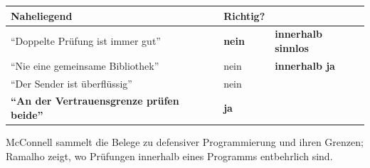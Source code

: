 \begin{warnung}
\begin{center}
\renewcommand{\arraystretch}{1.5}
\begin{tabular}{@{}P{3.2cm}P{2.2cm}P{2.4cm}@{}}
\toprule
\textbf{Naheliegend} & \textbf{Richtig?} & \\
\midrule
\enquote{Doppelte Prüfung ist immer gut} & \textcolor{akzent}{\textbf{nein}} & \textcolor{akzent}{\textbf{innerhalb sinnlos}}\\
\enquote{Nie eine gemeinsame Bibliothek} & \textcolor{akzent}{nein} & \textbf{innerhalb ja}\\
\enquote{Der Sender ist überflüssig} & \textcolor{akzent}{nein} & \\
\textbf{\enquote{An der Vertrauensgrenze prüfen beide}} & \textcolor{gruen}{\textbf{ja}} & \\
\bottomrule
\end{tabular}
\end{center}

\begin{center}
\begin{minipage}{0.88\textwidth}
\end{minipage}
\end{center}

\begin{center}
\end{center}
\end{warnung}
\vspace{-4pt}
\noindent McConnell sammelt die Be\-le\-ge zu de\-fen\-si\-ver Pro\-gram\-mie\-rung und ihren Grenzen; Ra\-mal\-ho zeigt, wo Prü\-fun\-gen inner\-halb eines Pro\-gramms ent\-behr\-lich sind.
